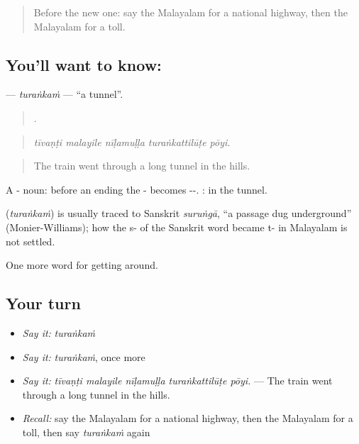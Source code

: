 \begin{quote}
Before the new one: say the Malayalam for a national highway, then the Malayalam for a toll.
\end{quote}

\subsection*{You'll want to know: }
\textbf{} — \emph{turaṅkaṁ} — \textquotedblleft{}a tunnel\textquotedblright{}.

\begin{quote}
    .
\end{quote}

\begin{quote}
\emph{tīvaṇṭi malayile nīḷamuḷḷa turaṅkattilūṭe pōyi.}
\end{quote}

\begin{quote}
The train went through a long tunnel in the hills.
\end{quote}

A - noun: before an ending the - becomes --. : in the tunnel.

\begin{cousinweb}
\textbf{} (\emph{turaṅkaṁ}) is usually traced to Sanskrit \emph{suruṅgā}, \textquotedblleft{}a passage dug underground\textquotedblright{} (Monier-Williams); how the s- of the Sanskrit word became t- in Malayalam is not settled.
\end{cousinweb}

\begin{grammarlens}[title={What you've built}]
One more word for getting around.
\end{grammarlens}

\subsection*{Your turn}
\begin{itemize}
\raggedright
  \item \emph{Say it:} \emph{turaṅkaṁ}
  \item \emph{Say it:} \emph{turaṅkaṁ}, once more
  \item \emph{Say it:} \emph{tīvaṇṭi malayile nīḷamuḷḷa turaṅkattilūṭe pōyi.} — The train went through a long tunnel in the hills.
  \item \emph{Recall:} say the Malayalam for a national highway, then the Malayalam for a toll, then say \emph{turaṅkaṁ} again
\end{itemize}

